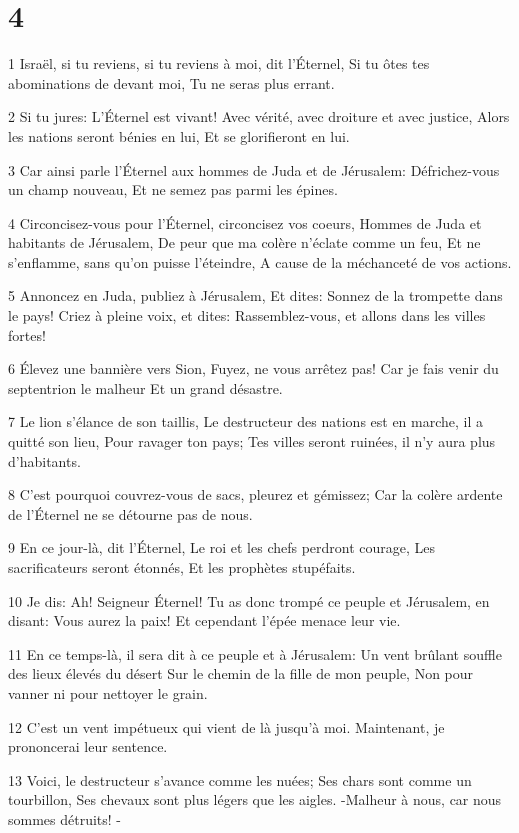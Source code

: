 \chapter{4}

\par 1 Israël, si tu reviens, si tu reviens à moi, dit l'Éternel, Si tu ôtes tes abominations de devant moi, Tu ne seras plus errant.
\par 2 Si tu jures: L'Éternel est vivant! Avec vérité, avec droiture et avec justice, Alors les nations seront bénies en lui, Et se glorifieront en lui.
\par 3 Car ainsi parle l'Éternel aux hommes de Juda et de Jérusalem: Défrichez-vous un champ nouveau, Et ne semez pas parmi les épines.
\par 4 Circoncisez-vous pour l'Éternel, circoncisez vos coeurs, Hommes de Juda et habitants de Jérusalem, De peur que ma colère n'éclate comme un feu, Et ne s'enflamme, sans qu'on puisse l'éteindre, A cause de la méchanceté de vos actions.
\par 5 Annoncez en Juda, publiez à Jérusalem, Et dites: Sonnez de la trompette dans le pays! Criez à pleine voix, et dites: Rassemblez-vous, et allons dans les villes fortes!
\par 6 Élevez une bannière vers Sion, Fuyez, ne vous arrêtez pas! Car je fais venir du septentrion le malheur Et un grand désastre.
\par 7 Le lion s'élance de son taillis, Le destructeur des nations est en marche, il a quitté son lieu, Pour ravager ton pays; Tes villes seront ruinées, il n'y aura plus d'habitants.
\par 8 C'est pourquoi couvrez-vous de sacs, pleurez et gémissez; Car la colère ardente de l'Éternel ne se détourne pas de nous.
\par 9 En ce jour-là, dit l'Éternel, Le roi et les chefs perdront courage, Les sacrificateurs seront étonnés, Et les prophètes stupéfaits.
\par 10 Je dis: Ah! Seigneur Éternel! Tu as donc trompé ce peuple et Jérusalem, en disant: Vous aurez la paix! Et cependant l'épée menace leur vie.
\par 11 En ce temps-là, il sera dit à ce peuple et à Jérusalem: Un vent brûlant souffle des lieux élevés du désert Sur le chemin de la fille de mon peuple, Non pour vanner ni pour nettoyer le grain.
\par 12 C'est un vent impétueux qui vient de là jusqu'à moi. Maintenant, je prononcerai leur sentence.
\par 13 Voici, le destructeur s'avance comme les nuées; Ses chars sont comme un tourbillon, Ses chevaux sont plus légers que les aigles. -Malheur à nous, car nous sommes détruits! -
